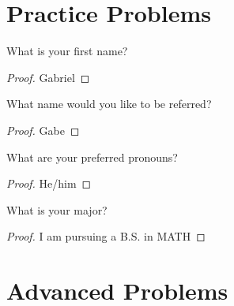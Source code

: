 \documentclass[num=0,duedate=01-27-21,course=Abstract\ Algebra\ II,proflastname=Walton]{hwtemplate}
\begin{document}

% 

\maketitle
\pagebreak

\section{Practice Problems}
\label{sec:practice_problems}

\problem[1]
\begin{claim}
	What is your first name?
\end{claim}

\begin{proof}
Gabriel
\end{proof}

\problem[2]
\begin{claim}
	What name would you like to be referred?
\end{claim}
\begin{proof}
Gabe
\end{proof}

\problem[3]
\begin{claim}
	What are your preferred pronouns?
\end{claim}
\begin{proof}
	He/him
\end{proof}

\problem[4]
\begin{claim}
	What is your major?
\end{claim}
\begin{proof}
	I am pursuing a B.S. in MATH
\end{proof}

\separator

\section{Advanced Problems}
\label{sec:advanced_problems}
\end{document}
